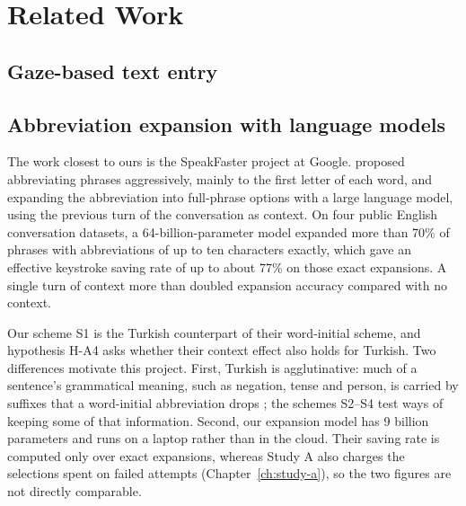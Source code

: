 \chapter{Related Work}
\label{ch:related}


\section{Gaze-based text entry}

\section{Abbreviation expansion with language models}
\label{sec:rw-abbreviation}

The work closest to ours is the SpeakFaster project at Google. \citet{cai2022context} proposed
abbreviating phrases aggressively, mainly to the first letter of each word, and expanding the
abbreviation into full-phrase options with a large language model, using the previous turn of the
conversation as context. On four public English conversation datasets, a 64-billion-parameter model
expanded more than 70\% of phrases with abbreviations of up to ten characters exactly, which gave an
effective keystroke saving rate of up to about 77\% on those exact expansions. A single turn of context
more than doubled expansion accuracy compared with no context.

Our scheme S1 is the Turkish counterpart of their word-initial scheme, and hypothesis H-A4 asks whether
their context effect also holds for Turkish. Two differences motivate this project. First, Turkish is
agglutinative: much of a sentence's grammatical meaning, such as negation, tense and person, is carried
by suffixes that a word-initial abbreviation drops ; the
schemes S2--S4 test ways of keeping some of that information. Second, our expansion model has 9 billion
parameters and runs on a laptop rather than in the cloud. Their saving rate is computed only over
exact expansions, whereas Study A also charges the selections spent on failed attempts
(Chapter~\ref{ch:study-a}), so the two figures are not directly comparable.

